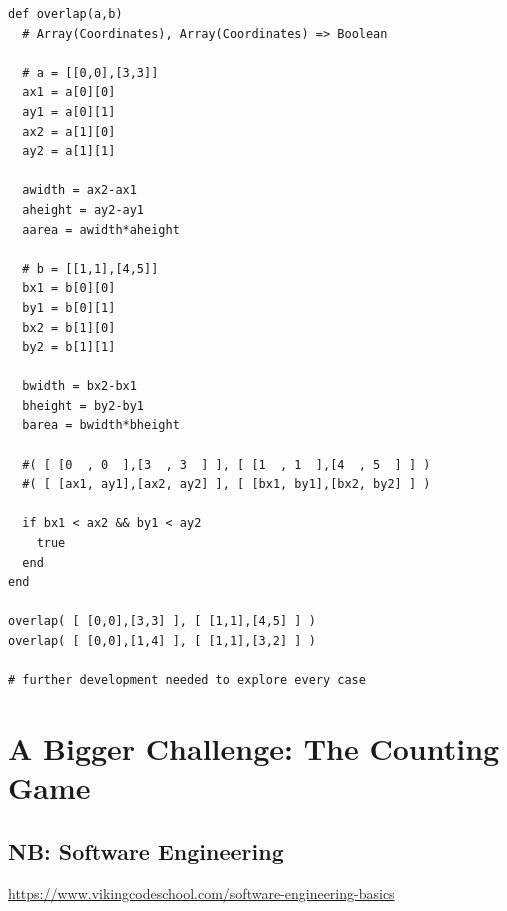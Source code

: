 \documentclass[11pt]{article}
\begin{document}
\begin{verbatim}
def overlap(a,b)
  # Array(Coordinates), Array(Coordinates) => Boolean

  # a = [[0,0],[3,3]]
  ax1 = a[0][0]
  ay1 = a[0][1] 
  ax2 = a[1][0]
  ay2 = a[1][1]

  awidth = ax2-ax1
  aheight = ay2-ay1
  aarea = awidth*aheight

  # b = [[1,1],[4,5]]
  bx1 = b[0][0]
  by1 = b[0][1]
  bx2 = b[1][0]
  by2 = b[1][1]

  bwidth = bx2-bx1
  bheight = by2-by1
  barea = bwidth*bheight

  #( [ [0  , 0  ],[3  , 3  ] ], [ [1  , 1  ],[4  , 5  ] ] )
  #( [ [ax1, ay1],[ax2, ay2] ], [ [bx1, by1],[bx2, by2] ] )

  if bx1 < ax2 && by1 < ay2
    true
  end
end

overlap( [ [0,0],[3,3] ], [ [1,1],[4,5] ] )
overlap( [ [0,0],[1,4] ], [ [1,1],[3,2] ] )

# further development needed to explore every case
\end{verbatim}

\section{A Bigger Challenge: The Counting Game}
\label{sec-2}

\subsection{NB: Software Engineering}
\label{sec-2-1}

\url{https://www.vikingcodeschool.com/software-engineering-basics}
\end{document}
